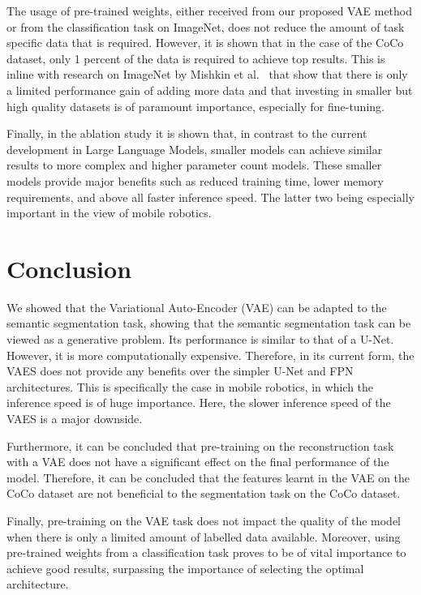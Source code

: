 The usage of pre-trained weights, either received from our proposed VAE method or from the classification task on ImageNet, does not reduce the amount of task specific data that is required. However, it is shown that in the case of the CoCo dataset, only 1 percent of the data is required to achieve top results. This is inline with research on ImageNet by Mishkin et al.~\cite{mishkin2017systematic} that show that there is only a limited performance gain of adding more data and that investing in smaller but high quality datasets is of paramount importance, especially for fine-tuning.

Finally, in the ablation study it is shown that, in contrast to the current development in Large Language Models, smaller models can achieve similar results to more complex and higher parameter count models. These smaller models provide major benefits such as reduced training time, lower memory requirements, and above all faster inference speed. The latter two being especially important in the view of mobile robotics.



\section{Conclusion}\label{chapter:conclusions}

We showed that the Variational Auto-Encoder (VAE) can be adapted to the semantic segmentation task, showing that the semantic segmentation task can be viewed as a generative problem. Its performance is similar to that of a U-Net. However, it is more computationally expensive. Therefore, in its current form, the VAES does not provide any benefits over the simpler U-Net and FPN architectures. This is specifically the case in mobile robotics, in which the inference speed is of huge importance. Here, the slower inference speed of the VAES is a major downside.

Furthermore, it can be concluded that pre-training on the reconstruction task with a VAE does not have a significant effect on the final performance of the model. Therefore, it can be concluded that the features learnt in the VAE on the CoCo dataset are not beneficial to the segmentation task on the CoCo dataset.

Finally, pre-training on the VAE task does not impact the quality of the model when there is only a limited amount of labelled data available. Moreover, using pre-trained weights from a classification task proves to be of vital importance to achieve good results, surpassing the importance of selecting the optimal architecture.
